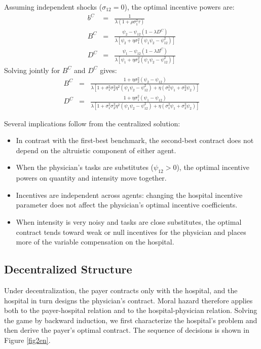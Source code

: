 ﻿\documentclass[12pt,letterpaper]{article}
\begin{document}
Assuming independent shocks ($\sigma_{12}=0$), the optimal incentive powers are:
\begin{eqnarray}
b^C&=&\frac{1}{\lambda(1+\rho\sigma_1^2\tau)}\label{bsoen}\\
B^C&=&\frac{\psi_2-\psi_{12}(1-\lambda D^C)}{\lambda[\psi_2+\eta\sigma_1^2(\psi_1\psi_2-\psi_{12}^2)]}\label{Bso1en}\\
D^C&=&\frac{\psi_1-\psi_{12}(1-\lambda B^C)}{\lambda[\psi_1+\eta\sigma_2^2(\psi_1\psi_2-\psi_{12}^2)]}\label{Dso1en}
\end{eqnarray}
Solving jointly for $B^C$ and $D^C$ gives:
\begin{eqnarray}
B^C&=&\frac{1+\eta\sigma_2^2(\psi_2-\psi_{12})}{\lambda[1+\sigma_1^2\sigma_2^2\eta^2(\psi_1\psi_2-\psi_{12}^2)+\eta(\sigma_1^2\psi_1+\sigma_2^2\psi_2)]}\label{Bso2en}\\
D^C&=&\frac{1+\eta\sigma_1^2(\psi_1-\psi_{12})}{\lambda[1+\sigma_1^2\sigma_2^2\eta^2(\psi_1\psi_2-\psi_{12}^2)+\eta(\sigma_1^2\psi_1+\sigma_2^2\psi_2)]}\label{Dso2en}
\end{eqnarray}

Several implications follow from the centralized solution:
\begin{itemize}
\item In contrast with the first-best benchmark, the second-best contract does not depend on the altruistic component of either agent.
\item When the physician's tasks are substitutes ($\psi_{12}>0$), the optimal incentive powers on quantity and intensity move together.
\item Incentives are independent across agents: changing the hospital incentive parameter does not affect the physician's optimal incentive coefficients.
\item When intensity is very noisy and tasks are close substitutes, the optimal contract tends toward weak or null incentives for the physician and places more of the variable compensation on the hospital.
\end{itemize}

\subsection{Decentralized Structure}
Under decentralization, the payer contracts only with the hospital, and the hospital in turn designs the physician's contract. Moral hazard therefore applies both to the payer-hospital relation and to the hospital-physician relation. Solving the game by backward induction, we first characterize the hospital's problem and then derive the payer's optimal contract. The sequence of decisions is shown in Figure \ref{fig2en}.
\end{document}

